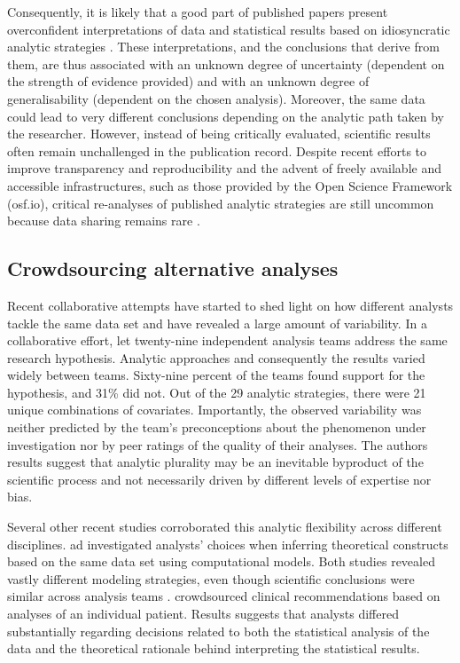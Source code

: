 \documentclass[Review,times,sageh]{sagej}
\begin{document}
Consequently, it is likely that a good part of published papers present overconfident interpretations of data and statistical results based on idiosyncratic analytic strategies \citep[e.g.,][]{simmons2011false, gelman2014statistical}.
These interpretations, and the conclusions that derive from them, are thus associated with an unknown degree of uncertainty (dependent on the strength of evidence provided) and with an unknown degree of generalisability (dependent on the chosen analysis).
Moreover, the same data could lead to very different conclusions depending on the analytic path taken by the researcher.
However, instead of being critically evaluated, scientific results often remain unchallenged in the publication record.
Despite recent efforts to improve transparency and reproducibility \citep[e.g.][]{miguel2014promoting, klein2018practical} and the advent of freely available and accessible infrastructures, such as those provided by the Open Science Framework (osf.io), critical re-analyses of published analytic strategies are still uncommon because data sharing remains rare \citep{wicherts2006poor}.

\hypertarget{crowdsourcing-alternative-analyses}{%
\subsection{Crowdsourcing alternative analyses}\label{crowdsourcing-alternative-analyses}}

Recent collaborative attempts have started to shed light on how different analysts tackle the same data set and have revealed a large amount of variability.
In a collaborative effort, \citet{silberzahn2018many} let twenty-nine independent analysis teams address the same research hypothesis.
Analytic approaches and consequently the results varied widely between teams.
Sixty-nine percent of the teams found support for the hypothesis, and 31\% did not.
Out of the 29 analytic strategies, there were 21 unique combinations of covariates.
Importantly, the observed variability was neither predicted by the team's preconceptions about the phenomenon under investigation nor by peer ratings of the quality of their analyses.
The authors results suggest that analytic plurality may be an inevitable byproduct of the scientific process and not necessarily driven by different levels of expertise nor bias.

Several other recent studies corroborated this analytic flexibility across different disciplines.
\citet{dutilh2019} ad \citet{starns2019assessing} investigated analysts' choices when inferring theoretical constructs based on the same data set using computational models.
Both studies revealed vastly different modeling strategies, even though scientific conclusions were similar across analysis teams \citetext{\citealp[see also][ on analytic flexibility in ecology]{Parker2020}; \citealp[and][ on neuroimaging data]{botvinik-nezer2020}}.
\citet{bastiaansen2020} crowdsourced clinical recommendations based on analyses of an individual patient.
Results suggests that analysts differed substantially regarding decisions related to both the statistical analysis of the data and the theoretical rationale behind interpreting the statistical results.
\end{document}
